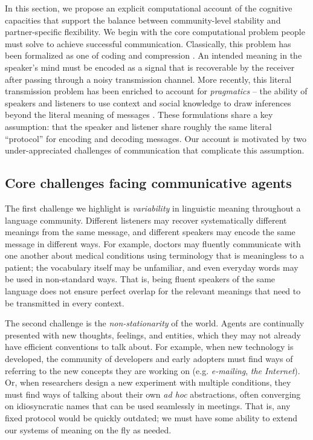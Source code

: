 
In this section, we propose an explicit computational account of the cognitive capacities that support the balance between community-level stability and partner-specific flexibility.
We begin with the core computational problem people must solve to achieve successful communication.
Classically, this problem has been formalized as one of coding and compression \cite{Shannon48}. 
An intended meaning in the speaker's mind must be encoded as a signal that is recoverable by the receiver after passing through a noisy transmission channel.
More recently, this literal transmission problem has been enriched to account for \emph{pragmatics} -- the ability of speakers and listeners to use context and social knowledge to draw inferences beyond the literal meaning of messages \cite{FrankeJager16_ProbabilisticPragmatics,goodman_pragmatic_2016}.
These formulations share a key assumption: that the speaker and listener share roughly the same literal ``protocol'' for encoding and decoding messages.
Our account is motivated by two under-appreciated challenges of communication that complicate this assumption. 

\subsection{Core challenges facing communicative agents}

The first challenge we highlight is \emph{variability} in linguistic meaning throughout a language community. 
Different listeners may recover systematically different meanings from the same message, and different speakers may encode the same message in different ways.
For example, doctors may fluently communicate with one another about medical conditions using terminology that is meaningless to a patient; the vocabulary itself may be unfamiliar, and even everyday words may be used in non-standard ways.
That is, being fluent speakers of the same language does not ensure perfect overlap for the relevant meanings that need to be transmitted in every context.

The second challenge is the \emph{non-stationarity} of the world. 
Agents are continually presented with new thoughts, feelings, and entities, which they may not already have efficient conventions to talk about.
For example, when new technology is developed, the community of developers and early adopters must find ways of referring to the new concepts they are working on (e.g. \emph{e-mailing}, \emph{the Internet}). 
Or, when researchers design a new experiment with multiple conditions, they must find ways of talking about their own \emph{ad hoc} abstractions, often converging on idiosyncratic names that can be used seamlessly in meetings.
That is, any fixed protocol would be quickly outdated; we must have some ability to extend our systems of meaning on the fly as needed.

